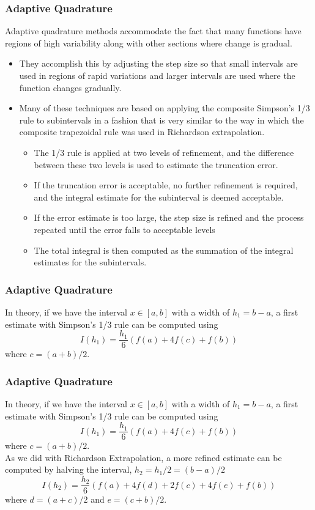 \documentclass{if-beamer}
\begin{document}
\begin{frame}[t]
	\frametitle{Adaptive Quadrature}
	Adaptive quadrature methods accommodate the fact that many functions have regions of
	high variability along with other sections where change is gradual.
	\begin{itemize}
		\item They accomplish this
		by adjusting the step size so that small intervals are used in regions of rapid variations and
		larger intervals are used where the function changes gradually. \vspace{5pt}
		\item Many of these techniques
		are based on applying the composite Simpson’s 1/3 rule to subintervals in a fashion that
		is very similar to the way in which the composite trapezoidal rule was used in Richardson
		extrapolation. \vspace{5pt}
		\begin{itemize}
			\item The 1/3 rule is applied at two levels of refinement, and the difference
			between these two levels is used to estimate the truncation error. \vspace{3pt}
			\item If the truncation error is
			acceptable, no further refinement is required, and the integral estimate for the subinterval is
			deemed acceptable. \vspace{3pt}
			\item  If the error estimate is too large, the step size is refined and the process
			repeated until the error falls to acceptable levels \vspace{3pt}
			\item The total integral is then computed as the
			summation of the integral estimates for the subintervals.
		\end{itemize}
	\end{itemize}
\end{frame}

\begin{frame}[t]
	\frametitle{Adaptive Quadrature}
	In theory, if we have the interval $x \in [a,b]$ with a width of $h_1 = b-a$, a first estimate with Simpson's 1/3 rule can be computed using
	$$ I(h_1) = \frac{h_1}{6}(f(a) + 4f(c) + f(b))$$ 
	where $c = (a+b)/2$. \\\vspace{5pt}
\end{frame}

\begin{frame}[t]
	\frametitle{Adaptive Quadrature}
	In theory, if we have the interval $x \in [a,b]$ with a width of $h_1 = b-a$, a first estimate with Simpson's 1/3 rule can be computed using
	$$ I(h_1) = \frac{h_1}{6}(f(a) + 4f(c) + f(b))$$ 
	where $c = (a+b)/2$. \\\vspace{5pt}
	As we did with Richardson Extrapolation, a more refined estimate can be computed by halving the interval, $h_2 = h_1/2 = (b-a)/2$
	$$I(h_2) =\frac{h_2}{6}(f(a) +4f(d) +2f(c) +4f(e) +f(b))$$
	where $d = (a+c)/2$ and $e = (c+b)/2$. 
\end{frame}
\end{document}
